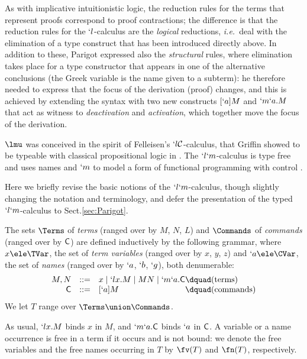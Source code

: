 \documentclass{CSML}
\def\ie{\emph{i.e.}}
\def\LC{the $`l$-calculus}
\begin{document}
As with implicative intuitionistic logic, the reduction rules for the terms that represent proofs correspond to proof contractions; the difference is that the reduction rules for {\LC} are the \emph{logical} reductions, \ie~deal with the elimination of a type construct that has been introduced directly above. 
In addition to these, Parigot expressed also the \emph{structural} rules, where elimination takes place for a type constructor that appears in one of the alternative conclusions (the Greek variable is the name given to a subterm): he therefore needed to express that the focus of the derivation (proof) changes, and this is achieved by extending the syntax with two new constructs $[`a]M$ and $`m`a.M$ that act as witness to \emph{deactivation} and \emph{activation}, which together move the focus of the derivation.

$\lmu$ was conceived in the spirit of Felleisen's $`l{\mathcal C}$-calculus, that Griffin showed to be typeable with classical propositional logic in \cite{Griffin'90}. 
%
The $`l`m$-calculus is type free and uses names and $`m$ to model a form of functional programming with control \cite{deGroote'94}.

Here we briefly revise the basic notions of the $`l`m$-calculus, though slightly changing the notation and terminology, and defer the presentation of the typed $`l`m$-calculus to Sect.\skp\ref{sec:Parigot}.

 \begin{defi} %
The sets $ \Terms$ of \emph{terms} (ranged over by $M$, $N$, $L$) and $ \Commands$ of \emph{commands} (ranged over by $\textrm{\sf C}$) are defined inductively by the following grammar, where $x \ele \TVar$, the set of \emph{term variables} (ranged over by $x$, $y$, $z$) and $`a \ele \CVar$, the set of \emph{names} (ranged over by $`a$, $`b$, $`g$), both denumerable:
%
%
 \[ \begin{array}{rcl@{\dquad}l}
M,N & :: = &x \mid `lx.M \mid MN \mid `m`a.\Cmd & (\textrm{terms}) \\
 \Cmd & :: = & [`a]M & (\textrm{commands})
 \end{array} \]
We let $T$ range over $\Terms \union \Commands$.

As usual, $`l x.M$ binds $x$ in $M$, and $`m `a .\textrm{\sf C}$ binds $`a $ in $\textrm{\sf C}$. 
A variable or a name occurrence is free in a term if it occurs and is not bound: we denote the free variables and the free names occurring in $T$ by $\fv(T)$ and $\fn(T)$, respectively.
 \end{defi}
\end{document}
